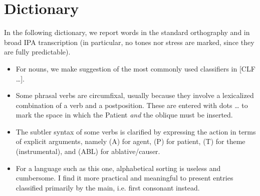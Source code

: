 \documentclass[11pt,a5paper]{book}
\newcommand{\qcn}[1]{\textcolor{AccentText}{\large#1}}
\begin{document}
\section{Dictionary}

In the following dictionary, we report words in the standard orthography and in broad IPA transcription (in particular, no tones nor stress are marked, since they are fully predictable).

\begin{itemize}
	\item For nouns, we make suggestion of the most commonly used classifiers in [CLF \ldots].
	\item Some phrasal verbs are circumfixal, usually because they involve a lexicalized combination of a verb and a postposition. These are entered with dots \qcn{\ldots} to mark the space in which the Patient \emph{and} the oblique must be inserted.
	\item The subtler syntax of some verbs is clarified by expressing the action in terms of explicit arguments, namely (A) for agent, (P) for patient, (T) for theme (instrumental), and (ABL) for ablative/causer.
	\item For a language such as this one, alphabetical sorting is useless and cumbersome. I find it more practical and meaningful to present entries classified primarily by the main, i.e. first consonant instead.
\end{itemize}




\newcommand{\lettersection}[1]{
	\vspace{0.5em}
	\begin{center}
		\Large #1
	\end{center}
 	\par
}

\newcommand{\dictentry}[3]{\qcn{#1} - /#2/ \hangindent=0.4cm #3 \par }
\newcommand{\dictsense}[3]{$\bullet$~\emph{#1} #2 #3 }
\newcommand{\dictexample}[2]{\qcn{#1} \emph{#2}}
\newcommand{\dictclassifiers}[1]{\begin{scriptsize}[CLF #1] \end{scriptsize}}
\newcommand{\dictref}[1]{\qcn{#1}}
\newcommand{\dictsensesep}{\,\,}
\newcommand{\dictvariantof}[1]{\textleftarrow variant form of #1}

\newpage

\begin{multicols}{2}
\begin{singlespace}



\end{singlespace}
\end{multicols}
\end{document}
